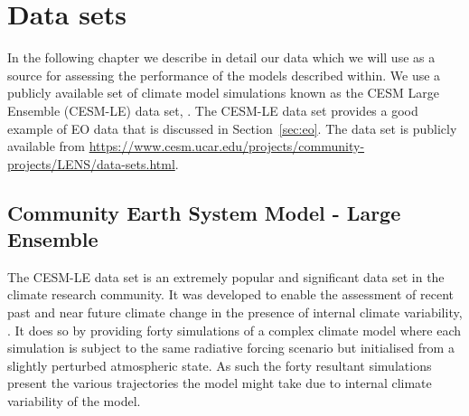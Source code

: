 

\chapter{Data sets\label{cha:data}}  %

\ifpdf
    \graphicspath{{Chapter2/Figs/Raster/}{Chapter2/Figs/PDF/}{Chapter2/Figs/}}
\else
    \graphicspath{{Chapter2/Figs/Vector/}{Chapter2/Figs/}}
\fi

In the following chapter we describe in detail our data which we will use as a source for assessing the performance of the models described within.
We use a publicly available set of climate model simulations known as the CESM Large Ensemble (CESM-LE) data set, \citep{kay_community_2015}.
The CESM-LE data set provides a good example of EO data that is discussed in Section~\ref{sec:eo}. The data set is publicly available from \url{https://www.cesm.ucar.edu/projects/community-projects/LENS/data-sets.html}.

 \section[CESM-LE]{\label{sec:cesmle}Community Earth System Model - Large Ensemble}
 The CESM-LE data set is an extremely popular and significant data set in the climate research community.
 It was developed to enable the assessment of recent past and near future climate change in the presence of internal climate variability, \citep{kay_community_2015}.
 It does so by providing forty simulations of a complex climate model where each simulation is subject to the same radiative forcing scenario but initialised from a slightly perturbed atmospheric state.
 As such the forty resultant simulations present the various trajectories the model might take due to internal climate variability of the model. 
 
